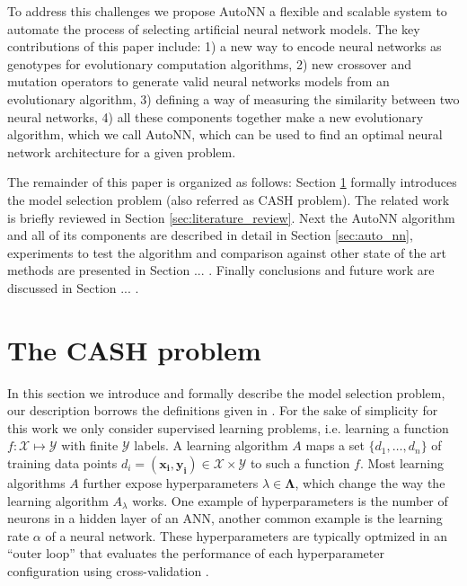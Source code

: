 \documentclass[journal]{IEEEtran}
\begin{document}
To address this challenges we propose AutoNN a flexible and scalable system to automate the process of selecting artificial neural network models. The key contributions of this paper include: 1) a new way to encode neural networks as genotypes for evolutionary computation algorithms, 2) new crossover and mutation operators to generate valid neural networks models from an evolutionary algorithm, 3) defining a way of measuring the similarity between two neural networks, 4) all these components together make a new evolutionary algorithm, which we call AutoNN, which can be used to find an optimal neural network architecture for a given problem.

The remainder of this paper is organized as follows: Section \ref{sec:model_selection} formally introduces the model selection problem (also referred as CASH problem). The related work is briefly reviewed in Section \ref{sec:literature_review}. Next the AutoNN algorithm and all of its components are described in detail in Section \ref{sec:auto_nn}, experiments to test the algorithm and comparison against other state of the art methods are presented in Section ... . Finally conclusions and future work are discussed in Section ... .


\section{The CASH problem}
\label{sec:model_selection}

In this section we introduce and formally describe the model selection problem, our description borrows the definitions given in \cite{Thornton2013}. For the sake of simplicity for this work we only consider supervised learning problems, i.e. learning a function $f: \mathcal{X} \mapsto \mathcal{Y}$ with finite $\mathcal{Y}$ labels. A learning algorithm $A$ maps a set $\{d_1, \ldots, d_n\}$ of training data points $d_i = (\mathbf{x_i}, \mathbf{y_i}) \in \mathcal{X} \times \mathcal{Y}$ to such a function $f$. Most learning algorithms $A$ further expose hyperparameters $\lambda \in \mathbf{\Lambda}$, which change the way the learning algorithm $A_{\lambda}$ works. One example of hyperparameters is the number of neurons in a hidden layer of an ANN, another common example is the learning rate $\alpha$ of a neural network. These hyperparameters are typically optmized in an ``outer loop'' that evaluates the performance of each hyperparameter configuration using cross-validation \cite{alpaydin2010}.
\end{document}

